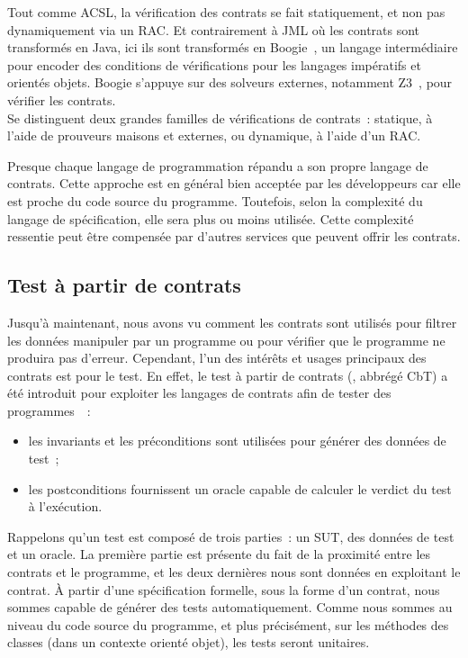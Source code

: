 Tout comme ACSL, la vérification des contrats se fait statiquement, et non pas
dynamiquement via un RAC. Et contrairement à JML où les contrats sont
transformés en Java, ici ils sont transformés en Boogie~,
un langage intermédiaire pour encoder des conditions de vérifications pour les
langages impératifs et orientés objets. Boogie s'appuye sur des solveurs
externes, notamment Z3~, pour vérifier les contrats. \\

Se distinguent deux grandes familles de vérifications de contrats~: statique, à
l'aide de prouveurs maisons et externes, ou dynamique, à l'aide d'un RAC.

Presque chaque langage de programmation répandu a son propre langage de
contrats. Cette approche est en général bien acceptée par les développeurs car
elle est proche du code source du programme. Toutefois, selon la complexité du
langage de spécification, elle sera plus ou moins utilisée. Cette complexité
ressentie peut être compensée par d'autres services que peuvent offrir les
contrats.

\subsection{Test à partir de contrats}
\label{subsection:sota:cbt}

Jusqu'à maintenant, nous avons vu comment les contrats sont utilisés pour
{\strong filtrer} les données manipuler par un programme ou pour vérifier que le
programme ne produira pas d'erreur. Cependant, l'un des intérêts et usages
principaux des contrats est pour le {\strong test}. En effet, le {\strong test à
partir de contrats} (, abbrégé CbT) a été
introduit pour exploiter les langages de contrats afin de tester des
programmes~~:

\begin{itemize}

\item les invariants et les préconditions sont utilisées pour {\strong générer
des données} de test~;

\item les postconditions {\strong fournissent un oracle} capable de calculer le
verdict du test à l'exécution.

\end{itemize}

Rappelons qu'un test est composé de trois parties~: un SUT, des données de test
et un oracle. La première partie est présente du fait de la proximité entre les
contrats et le programme, et les deux dernières nous sont données en exploitant
le contrat. À partir d'une spécification formelle, sous la forme d'un contrat,
nous sommes capable de générer des tests automatiquement. Comme nous sommes au
niveau du code source du programme, et plus précisément, sur les méthodes des
classes (dans un contexte orienté objet), les tests seront {\strong unitaires}. \\


